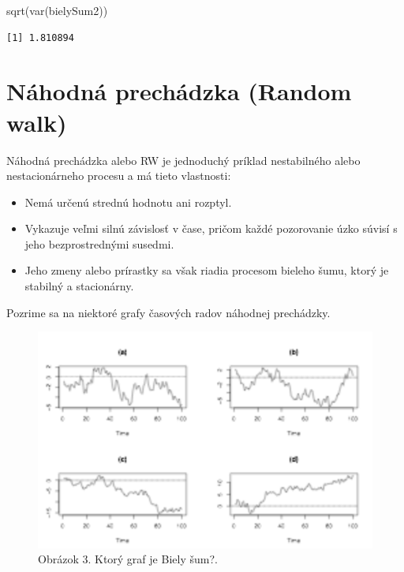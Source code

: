 \documentclass[
  letterpaper,
  DIV=11,
  numbers=noendperiod]{scrreprt}
\newenvironment{Shaded}{\begin{snugshade}}{\end{snugshade}}
\newcommand{\FunctionTok}[1]{\textcolor[rgb]{0.28,0.35,0.67}{#1}}
\newcommand{\NormalTok}[1]{\textcolor[rgb]{0.00,0.23,0.31}{#1}}
\providecommand{\tightlist}{%
  \setlength{\itemsep}{0pt}\setlength{\parskip}{0pt}}\usepackage{longtable,booktabs,array}
\begin{document}
\begin{Shaded}
\begin{Highlighting}[]
\FunctionTok{sqrt}\NormalTok{(}\FunctionTok{var}\NormalTok{(bielySum2))}
\end{Highlighting}
\end{Shaded}

\begin{verbatim}
[1] 1.810894
\end{verbatim}

\section{Náhodná prechádzka (Random
walk)}\label{nuxe1hodnuxe1-prechuxe1dzka-random-walk}

Náhodná prechádzka alebo RW je jednoduchý príklad nestabilného alebo
nestacionárneho procesu a má tieto vlastnosti:

\begin{itemize}
\tightlist
\item
  Nemá určenú strednú hodnotu ani rozptyl.
\item
  Vykazuje veľmi silnú závislosť v čase, pričom každé pozorovanie úzko
  súvisí s jeho bezprostrednými susedmi.
\item
  Jeho zmeny alebo prírastky sa však riadia procesom bieleho šumu, ktorý
  je stabilný a stacionárny.
\end{itemize}

Pozrime sa na niektoré grafy časových radov náhodnej prechádzky.

\begin{figure}[H]

{\centering \includegraphics{rw.png}

}

\caption{Obrázok 3. Ktorý graf je Biely šum?.}

\end{figure}%
\end{document}
